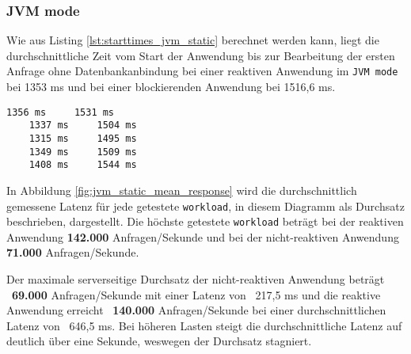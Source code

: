 \subsubsection{JVM mode}
\label{subsubsec:static_jvm_mode}
Wie aus Listing \ref{lst:starttimes_jvm_static} berechnet werden kann, liegt die durchschnittliche Zeit vom Start der Anwendung bis zur
Bearbeitung der ersten Anfrage ohne Datenbankanbindung bei einer reaktiven Anwendung im \verb|JVM mode| bei 1353 ms und bei einer
blockierenden Anwendung bei 1516,6 ms.
\begin{lstlisting}[caption=Startzeiten im JVM mode mit statischen Ressourcen, captionpos=b, label=lst:starttimes_jvm_static]
    1356 ms     1531 ms
    1337 ms     1504 ms
    1315 ms     1495 ms
    1349 ms     1509 ms
    1408 ms     1544 ms
\end{lstlisting}

In Abbildung \ref{fig:jvm_static_mean_response} wird die durchschnittlich gemessene Latenz für jede getestete \verb|workload|,
in diesem Diagramm als Durchsatz beschrieben, dargestellt.
Die höchste getestete \verb|workload| beträgt bei der reaktiven Anwendung \textbf{142.000} Anfragen/Sekunde und bei der
nicht-reaktiven Anwendung \textbf{71.000} Anfragen/Sekunde.

Der maximale serverseitige Durchsatz der nicht-reaktiven Anwendung beträgt ~\textbf{69.000} Anfragen/Sekunde mit einer
Latenz von ~217,5 ms und
die reaktive Anwendung erreicht ~\textbf{140.000} Anfragen/Sekunde bei einer durchschnittlichen Latenz von ~646,5 ms.
Bei höheren Lasten steigt die durchschnittliche Latenz auf deutlich über eine Sekunde, weswegen der Durchsatz stagniert.

